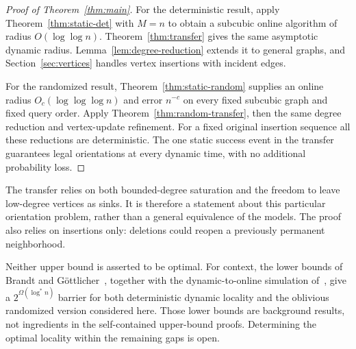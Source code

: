 \documentclass[11pt]{article}
\theoremstyle{definition}
\begin{document}
\begin{proof}[Proof of Theorem~\ref{thm:main}]
For the deterministic result, apply Theorem~\ref{thm:static-det} with
$M=n$ to obtain a subcubic online algorithm of radius $O(\log\log n)$.
Theorem~\ref{thm:transfer} gives the same asymptotic dynamic radius.
Lemma~\ref{lem:degree-reduction} extends it to general graphs, and
Section~\ref{sec:vertices} handles vertex insertions with incident edges.

For the randomized result, Theorem~\ref{thm:static-random} supplies an
online radius $O_c(\log\log\log n)$ and error $n^{-c}$ on every fixed
subcubic graph and fixed query order. Apply
Theorem~\ref{thm:random-transfer}, then the same degree reduction and
vertex-update refinement. For a fixed original insertion sequence all
these reductions are deterministic. The one static success event in the
transfer guarantees legal orientations at every dynamic time, with no
additional probability loss.
\end{proof}

The transfer relies on both bounded-degree saturation and the freedom to
leave low-degree vertices as sinks. It is therefore a statement about this
particular orientation problem, rather than a general equivalence of the
models. The proof also relies on insertions only: deletions could reopen a
previously permanent neighborhood.

Neither upper bound is asserted to be optimal. For context, the lower
bounds of Brandt and G\"ottlicher~\cite[Theorem 1.2 and Corollary 1.3]{lower},
together with the dynamic-to-online simulation of~\cite{models}, give a
$2^{\Omega(\log^* n)}$ barrier for both deterministic dynamic locality and
the oblivious randomized version considered here. Those lower bounds are
background results, not ingredients in the self-contained upper-bound
proofs. Determining the optimal locality within the remaining gaps is open.
\end{document}
